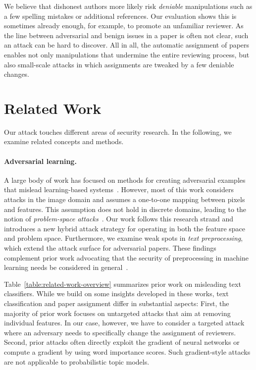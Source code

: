 \documentclass[letterpaper,twocolumn,10pt]{article}
\begin{document}
We believe that dishonest authors more likely risk \emph{deniable} manipulations such as a few spelling mistakes or additional references. Our evaluation shows this is sometimes already enough, for example, to promote an unfamiliar reviewer.
As the line between adversarial and benign issues in a paper is often not clear, such an attack can be hard to discover.
All in all, the automatic assignment of papers enables not only manipulations that undermine the entire reviewing process, but also small-scale attacks in which assignments are tweaked by a few deniable changes.  \section{Related Work}
\label{sec:related}

Our attack touches different areas of security research. In the following, we examine related concepts and methods.

\paragraph{Adversarial learning.} A large body of work has focused on methods for creating adversarial examples that mislead learning-based systems~\cite{biggio-18-wild}. However, most of this work considers attacks in the image domain and assumes a one-to-one mapping between pixels and features. This assumption does not hold in discrete domains, leading to the notion of \emph{problem-space attacks}~\cite{pierazzi-20-intriguing, quiring-19-misleading}. Our work follows this research strand and introduces a new hybrid attack strategy for operating in both the feature space and problem space.
Furthermore, we examine weak spots in \emph{text preprocessing}, which extend the attack surface for adversarial papers. 
These findings complement prior work advocating that the security of preprocessing in machine learning needs be considered in general~\cite{quiring-20-adversarial}. 

Table~\ref{table:related-work-overview} summarizes prior work on misleading text classifiers. While we build on some insights developed in these works, text classification and paper assignment differ in substantial aspects: First, the majority of prior work focuses on untargeted attacks that aim at removing individual features. In our case, however, we have to consider a targeted attack where an adversary needs to specifically change the assignment of reviewers. Second, prior attacks often directly exploit the gradient of neural networks or compute a gradient by using word importance scores. Such gradient-style attacks are not applicable to probabilistic topic models. 
\end{document}
